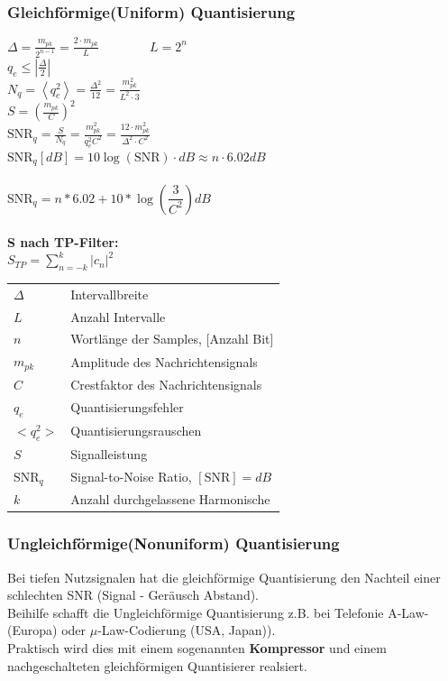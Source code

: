 \subsubsection{Gleichförmige(Uniform) Quantisierung}
\begin{multicols}{2}
	$ \Delta = \frac{m_{pk}}{2^{n-1}} = \frac{2 \cdot m_{pk}}{L} \qquad \qquad L =
	2^n$\\
	$q_e \leq |\frac{\Delta}{2}|$\\
	$ N_q = \left< q_e^2 \right> = \frac{\Delta^2}{12} =
	\frac{m_{pk}^2}{L^2 \cdot 3}$ \\
	$ S = \left( \frac{ m_{pk} }{C} \right)^2$ \\
	$ \text{SNR}_{q} =\frac{S}{N_q}=\frac{m_{pk}^2}{q_e^2C^2} = \frac{12\cdot m_{pk}^2}{\Delta^2\cdot C^2}$\\
	$\text{SNR}_{q} \left[dB\right] =10 \log(\text{SNR}) \cdot dB \approx n \cdot
	6.02dB$ \\ \\
	
		$\text{SNR}_{q}=n*6.02+10*\log(\dfrac{3}{C^{2}})dB$\\\\
	\textbf{S nach TP-Filter:}\\
	$S_{TP} = \sum\limits_{n=-k}^{k} |c_n|^2 $
\columnbreak

	\begin{tabular}{l l}
		$\Delta$ & Intervallbreite \\
		$L$ & Anzahl Intervalle \\
		$n$ & Wortlänge der Samples, [Anzahl Bit] \\
		$m_{pk}$ & Amplitude des Nachrichtensignals \\
		$C$ & Crestfaktor des Nachrichtensignals \\
		$q_e$ & Quantisierungsfehler \\
		$<q_e^2>$ & Quantisierungsrauschen \\
		$S$ & Signalleistung\\
		$\text{SNR}_{q}$ & Signal-to-Noise Ratio, $[\text{SNR}] = dB$ \\
		$k$ & Anzahl durchgelassene Harmonische
	\end{tabular}
\end{multicols}

\newpage
\subsubsection{Ungleichförmige(Nonuniform) Quantisierung }
Bei tiefen Nutzsignalen hat die gleichförmige Quantisierung den Nachteil einer schlechten SNR
(Signal - Geräusch Abstand). \\
Beihilfe schafft die Ungleichförmige Quantisierung z.B. bei Telefonie
A-Law-(Europa) oder $\mu$-Law-Codierung (USA, Japan)). \\
Praktisch wird dies mit einem sogenannten \textbf{Kompressor} und einem nachgeschalteten
gleichförmigen Quantisierer realsiert.

